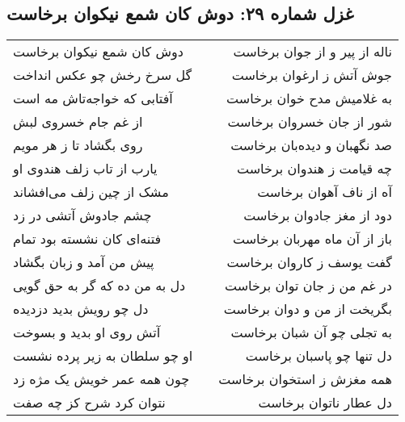 \begin{center}
\section*{غزل شماره ۲۹: دوش کان شمع نیکوان برخاست}
\label{sec:029}
\begin{longtable}{l p{0.5cm} r}
دوش کان شمع نیکوان برخاست
&&
ناله از پیر و از جوان برخاست
\\
گل سرخ رخش چو عکس انداخت
&&
جوش آتش ز ارغوان برخاست
\\
آفتابی که خواجه‌تاش مه است
&&
به غلامیش مدح خوان برخاست
\\
از غم جام خسروی لبش
&&
شور از جان خسروان برخاست
\\
روی بگشاد تا ز هر مویم
&&
صد نگهبان و دیده‌بان برخاست
\\
یارب از تاب زلف هندوی او
&&
چه قیامت ز هندوان برخاست
\\
مشک از چین زلف می‌افشاند
&&
آه از ناف آهوان برخاست
\\
چشم جادوش آتشی در زد
&&
دود از مغز جادوان برخاست
\\
فتنه‌ای کان نشسته بود تمام
&&
باز از آن ماه مهربان برخاست
\\
پیش من آمد و زبان بگشاد
&&
گفت یوسف ز کاروان برخاست
\\
دل به من ده که گر به حق گویی
&&
در غم من ز جان توان برخاست
\\
دل چو رویش بدید دزدیده
&&
بگریخت از من و دوان برخاست
\\
آتش روی او بدید و بسوخت
&&
به تجلی چو آن شبان برخاست
\\
او چو سلطان به زیر پرده نشست
&&
دل تنها چو پاسبان برخاست
\\
چون همه عمر خویش یک مژه زد
&&
همه مغزش ز استخوان برخاست
\\
نتوان کرد شرح کز چه صفت
&&
دل عطار ناتوان برخاست
\\
\end{longtable}
\end{center}
